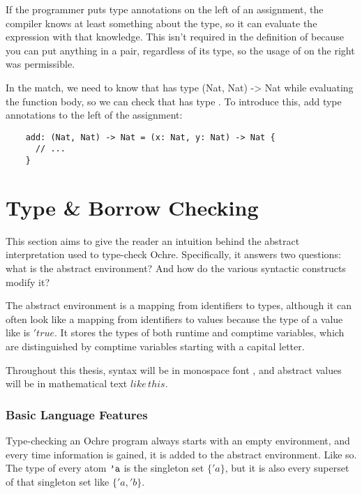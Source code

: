 \documentclass[12pt,twoside]{report}
\begin{document}
If the programmer puts type annotations on the left of an assignment, the compiler knows at least something about the type, so it can evaluate the expression with that knowledge. This isn't required in the definition of  because you can put anything in a pair, regardless of its type, so the usage of  on the right was permissible.

In the  match, we need to know that  has type {(Nat, Nat) -> Nat} while evaluating the function body, so we can check that  has type . To introduce this, add type annotations to the left of the assignment:

  \begin{verbatim}
    add: (Nat, Nat) -> Nat = (x: Nat, y: Nat) -> Nat {
      // ...
    }
  \end{verbatim}

\cleardoublepage
\section{Type \& Borrow Checking}
\label{section:checkingexample}
This section aims to give the reader an intuition behind the abstract interpretation used to type-check Ochre. Specifically, it answers two questions: what is the abstract environment? And how do the various syntactic constructs modify it?

The abstract environment is a mapping from identifiers to types, although it can often look like a mapping from identifiers to values because the type of a value like  is $'true$. It stores the types of both runtime and comptime variables, which are distinguished by comptime variables starting with a capital letter.

Throughout this thesis, syntax will be in monospace font , and abstract values will be in mathematical text $like\,this$.

\subsubsection{Basic Language Features}
Type-checking an Ochre program always starts with an empty environment, and every time information is gained, it is added to the abstract environment. Like so. The type of every atom $\text{\texttt{'a}}$ is the singleton set $\{'a\}$, but it is also every superset of that singleton set like $\{'a, 'b\}$.
\end{document}
